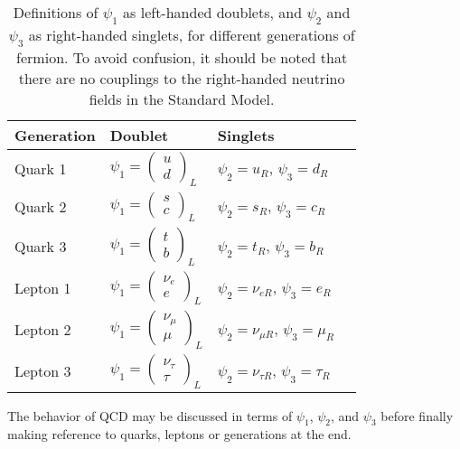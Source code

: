 \begin{table}[h!]
\caption{Definitions of $\psi_1$ as left-handed doublets, and $\psi_2$ and $\psi_3$ as right-handed singlets, for different generations of fermion. To avoid confusion, it should be noted that there are no couplings to the right-handed neutrino fields in the Standard Model.}
\begin{center}
\begin{tabular}{l l l l}
\toprule
Generation & Doublet & Singlets \\
\midrule
Quark 1 & $\psi_1=\begin{pmatrix}u\\d\end{pmatrix}_L$             & $\psi_2=u_R$, $\psi_3=d_R$ \\
Quark 2 & $\psi_1=\begin{pmatrix}s\\c\end{pmatrix}_L$             & $\psi_2=s_R$, $\psi_3=c_R$ \\
Quark 3 & $\psi_1=\begin{pmatrix}t\\b\end{pmatrix}_L$             & $\psi_2=t_R$, $\psi_3=b_R$ \\
Lepton 1 & $\psi_1=\begin{pmatrix}\nu_e\\e\end{pmatrix}_L$        & $\psi_2=\nu_{eR}$, $\psi_3=e_R$ \\
Lepton 2 & $\psi_1=\begin{pmatrix}\nu_\mu\\\mu\end{pmatrix}_L$    & $\psi_2=\nu_{\mu R}$, $\psi_3=\mu_R$ \\
Lepton 3 & $\psi_1=\begin{pmatrix}\nu_\tau\\\tau\end{pmatrix}_L$  & $\psi_2=\nu_{\tau R}$, $\psi_3=\tau_R$ \\
\bottomrule
\end{tabular}
\label{tab:su2Doublets}
\end{center}
\end{table}
The behavior of QCD may be discussed in terms of $\psi_1$, $\psi_2$, and $\psi_3$ before finally making reference to quarks, leptons or generations at the end.
